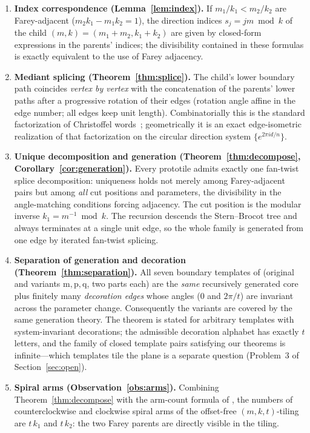 \documentclass[11pt]{article}
\theoremstyle{remark}
\theoremstyle{definition}
\begin{document}
\begin{enumerate}
\item \textbf{Index correspondence (Lemma~\ref{lem:index}).}
If $m_1/k_1<m_2/k_2$ are Farey-adjacent ($m_2k_1-m_1k_2=1$), the direction indices
$s_j = jm\bmod k$ of the child $(m,k)=(m_1+m_2,k_1+k_2)$ are given by closed-form
expressions in the parents' indices; the divisibility contained in these formulas is
exactly equivalent to the use of Farey adjacency.
\item \textbf{Mediant splicing (Theorem~\ref{thm:splice}).}
The child's lower boundary path coincides \emph{vertex by vertex} with the concatenation
of the parents' lower paths after a progressive rotation of their edges
(rotation angle affine in the edge number; all edges keep unit length).
Combinatorially this is the standard factorization of Christoffel
words~\cite{BorelLaubie1993,BLRS2008}; geometrically it is an exact edge-isometric
realization of that factorization on the circular direction system $\{e^{2\pi i d/n}\}$.
\item \textbf{Unique decomposition and generation
(Theorem~\ref{thm:decompose}, Corollary~\ref{cor:generation}).}
Every prototile admits exactly one fan-twist splice decomposition: uniqueness holds not
merely among Farey-adjacent pairs but among \emph{all} cut positions and parameters, the
divisibility in the angle-matching conditions forcing adjacency. The cut position is the
modular inverse $k_1=m^{-1}\bmod k$. The recursion descends the Stern--Brocot tree and
always terminates at a single unit edge, so the whole family is generated from one edge
by iterated fan-twist splicing.
\item \textbf{Separation of generation and decoration (Theorem~\ref{thm:separation}).}
All seven boundary templates of \cite{Imura2026} (original and variants
$\mathrm{m},\mathrm{p},\mathrm{q}$, two parts each) are the \emph{same} recursively
generated core plus finitely many \emph{decoration edges} whose angles
($0$ and $2\pi/t$) are invariant across the parameter change. Consequently the variants
are covered by the same generation theory. The theorem is stated for arbitrary
templates with system-invariant decorations; the admissible decoration alphabet has
exactly $t$ letters, and the family of closed template pairs satisfying our theorems is
infinite---which templates tile the plane is a separate question
(Problem~3 of Section~\ref{sec:open}).
\item \textbf{Spiral arms (Observation~\ref{obs:arms}).}
Combining Theorem~\ref{thm:decompose} with the arm-count formula of \cite{Imura2026},
the numbers of counterclockwise and clockwise spiral arms of the offset-free
$(m,k,t)$-tiling are $t\,k_1$ and $t\,k_2$: the two Farey parents are directly visible
in the tiling.
\end{enumerate}
\end{document}
